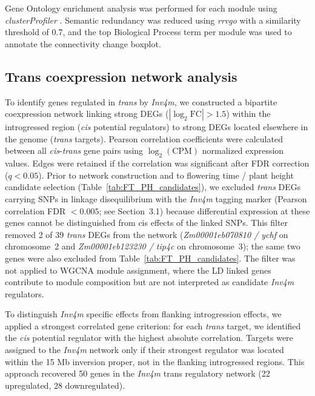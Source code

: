 \documentclass[9pt,twocolumn,twoside]{rilabRxiv}
\newcommand{\invfour}{\textit{Inv4m}\xspace}
\begin{document}
Gene Ontology enrichment analysis was performed for each module using \textit{clusterProfiler} \cite{yu2012}.
Semantic redundancy was reduced using \textit{rrvgo} \cite{sayols2023} with a similarity threshold of 0.7, and the top Biological Process term per module was used to annotate the connectivity change boxplot.

\subsection{Trans coexpression network analysis}

To identify genes regulated in \textit{trans} by \invfour, we constructed a bipartite coexpression network linking strong DEGs ($|\log_2 \text{FC}| > 1.5$) within the introgressed region (\textit{cis} potential regulators) to strong DEGs located elsewhere in the genome (\textit{trans} targets).
Pearson correlation coefficients were calculated between all \textit{cis}-\textit{trans} gene pairs using $\log_2(\text{CPM})$ normalized expression values.
Edges were retained if the correlation was significant after FDR correction ($q < 0.05$).
Prior to network construction and to flowering time / plant height candidate selection (Table~\ref{tab:FT_PH_candidates}), we excluded \textit{trans} DEGs carrying SNPs in linkage disequilibrium with the \invfour tagging marker (Pearson correlation FDR $< 0.005$; see Section~3.1) because differential expression at these genes cannot be distinguished from cis effects of the linked SNPs.
This filter removed 2 of 39 \textit{trans} DEGs from the network (\textit{Zm00001eb070810 / ychf} on chromosome~2 and \textit{Zm00001eb123230 / tip4c} on chromosome~3); the same two genes were also excluded from Table~\ref{tab:FT_PH_candidates}.
The filter was not applied to WGCNA module assignment, where the LD linked genes contribute to module composition but are not interpreted as candidate \invfour regulators.

To distinguish \invfour specific effects from flanking introgression effects, we applied a strongest correlated gene criterion: for each \textit{trans} target, we identified the \textit{cis} potential regulator with the highest absolute correlation.
Targets were assigned to the \invfour network only if their strongest regulator was located within the 15 Mb inversion proper, not in the flanking introgressed regions.
This approach recovered 50 genes in the \invfour trans regulatory network (22 upregulated, 28 downregulated).
\end{document}
